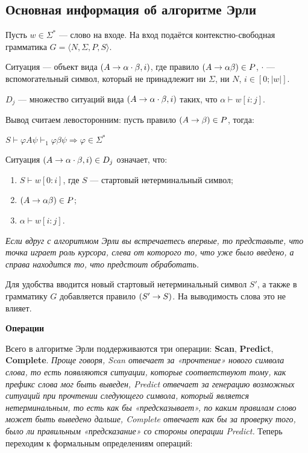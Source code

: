 \subsection{Основная информация об алгоритме Эрли}

Пусть $w \in \Sigma^*$ — слово на входе. На вход подаётся контекстно-свободная грамматика $G = \langle N, \Sigma, P, S \rangle$.

\Def Ситуация — объект вида $\left({A \rightarrow \alpha \cdot \beta, i}\right)$, где правило $\left({A \rightarrow \alpha \beta}\right) \in P$, $\cdot$ — вспомогательный символ, который не принадлежит ни $\Sigma$, ни $N$, $i \in [0; |w|]$.

\Def $D_j$ — множество ситуаций вида $\left({A \rightarrow \alpha \cdot \beta, i}\right)$ таких, что $\alpha \vdash w[i : j]$.

\Note Вывод считаем левосторонним: пусть правило $\left({A \rightarrow \beta}\right) \in P$, тогда:

\begin{center}
    $S \vdash \varphi A \psi \vdash_1 \varphi \beta \psi \Longrightarrow \varphi \in \Sigma^*$
\end{center}

\Note Ситуация $\left({A \rightarrow \alpha \cdot \beta, i}\right) \in D_j$ означает, что:

\begin{enumerate}
    \item $S \vdash w [0 : i]$, где $S$ — стартовый нетерминальный символ;
    \item $\left({A \rightarrow \alpha \beta}\right) \in P$;
    \item $\alpha \vdash w[i:j]$.
\end{enumerate}

\textit{Если вдруг с алгоритмом Эрли вы встречаетесь впервые, то представьте, что точка играет роль курсора, слева от которого то, что уже было введено, а справа находится то, что предстоит обработать.}

\Note Для удобства вводится новый стартовый нетерминальный символ $S'$, а также в грамматику $G$ добавляется правило $\left({S' \rightarrow S}\right)$. На выводимость слова это не влияет.

\textbf{Операции}

Всего в алгоритме Эрли поддерживаются три операции: \textbf{Scan}, \textbf{Predict}, \textbf{Complete}. \textit{Проще говоря, Scan отвечает за «прочтение» нового символа слова, то есть появляются ситуации, которые соответствуют тому, как префикс слова мог быть выведен, Predict отвечает за генерацию возможных ситуаций при прочтении следующего символа, который является нетерминальным, то есть как бы «предсказывает», по каким правилам слово может быть выведено дальше, Complete отвечает как бы за проверку того, было ли правильным «предсказание» со стороны операции Predict.} Теперь переходим к формальным определениям операций:


